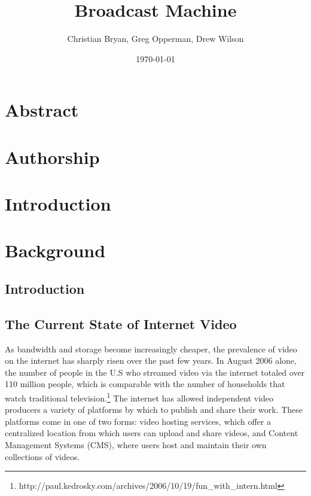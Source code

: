 \documentclass[a4paper,12pt]{report}
\author{Christian Bryan, Greg Opperman, Drew Wilson}
\date{\today}
\title{Broadcast Machine}
\begin{document}
\maketitle


\chapter*{Abstract}

\chapter*{Authorship}

\tableofcontents

\chapter{Introduction}

\chapter{Background}

\section{Introduction}

\section{The Current State of Internet Video}
As bandwidth and storage become increasingly cheaper, the prevalence of video on the internet has sharply risen over the past few years. 
In August 2006 alone, the number of people in the U.S who streamed video 
via the internet totaled over 110 million people, which is comparable 
with the number of households that watch traditional television.\footnote{http://paul.kedrosky.com/archives/2006/10/19/fun\_with\_intern.html}
The internet has allowed independent video producers a variety of platforms by which to publish and share their work. These platforms come in one of two forms: video hosting services, which offer a centralized location from which users can upload and share videos, and Content Management Systems (CMS), where users host and maintain their own collections of videos.
\end{document}
